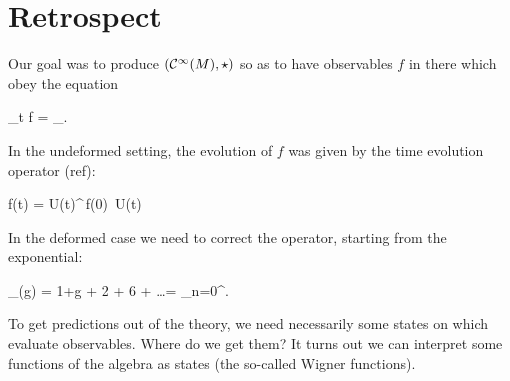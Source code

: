 \section{Retrospect}
Our goal was to produce $(\mathcal{C}^\infty(M), \star)$ so as to have observables $f$ in there which obey the equation
\begin{eqalign}
	\partial_t f = \planck [f,h]_\star.
\end{eqalign}
In the undeformed setting, the evolution of $f$ was given by the time evolution operator (ref):
\begin{eqalign}
	f(t) = U(t)^\dagger \,f(0)\, U(t)
\end{eqalign}
In the deformed case we need to correct the operator, starting from the exponential:
\begin{eqalign}
	\exp_\star (g) = 1+g + 2 + 6 + \ldots = \sum_{n=0}^\infty {}.
\end{eqalign}
To get predictions out of the theory, we need necessarily some states on which evaluate observables. Where do we get them? It turns out we can interpret some functions of the algebra as states (the so-called Wigner functions).
